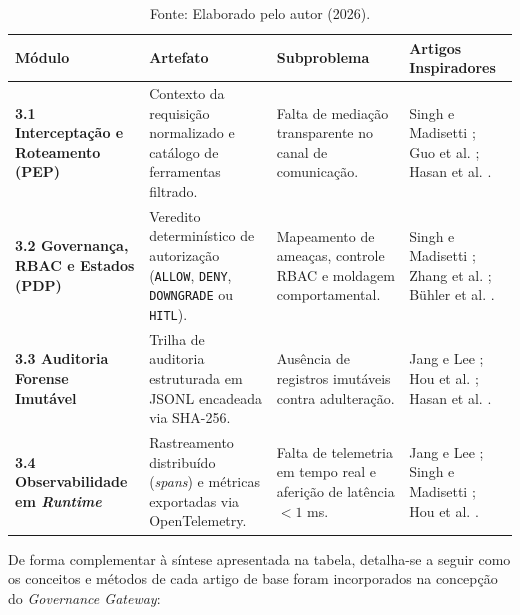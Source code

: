 \begin{table}[H]
\centering
\caption{Mapeamento entre os módulos do Modelo Conceitual, artefatos, subproblemas e artigos inspiradores.}
\label{tab:mapeamento_modelo_artigos}
\footnotesize
\setlength{\tabcolsep}{5pt}
\renewcommand{\arraystretch}{1.3}
\begin{tabular}{|p{3.2cm}|p{3.8cm}|p{3.9cm}|p{3.4cm}|}
\hline
\textbf{Módulo} & \textbf{Artefato} & \textbf{Subproblema} & \textbf{Artigos Inspiradores} \\
\hline
\textbf{3.1 Interceptação e Roteamento (PEP)} & Contexto da requisição normalizado e catálogo de ferramentas filtrado. & Falta de mediação transparente no canal de comunicação. & Singh e Madisetti \cite{singh2026mcpsecure}; Guo et al. \cite{guo2025measurement}; Hasan et al. \cite{hasan2026mcp}. \\
\hline
\textbf{3.2 Governança, RBAC e Estados (PDP)} & Veredito determinístico de autorização (\texttt{ALLOW}, \texttt{DENY}, \texttt{DOWNGRADE} ou \texttt{HITL}). & Mapeamento de ameaças, controle RBAC e moldagem comportamental. & Singh e Madisetti \cite{singh2026mcpsecure}; Zhang et al. \cite{zhang2025acfix}; Bühler et al. \cite{buhler2026agentbound}. \\
\hline
\textbf{3.3 Auditoria Forense Imutável} & Trilha de auditoria estruturada em JSONL encadeada via SHA-256. & Ausência de registros imutáveis contra adulteração. & Jang e Lee \cite{jang2026hierarchical}; Hou et al. \cite{hou2025mcp}; Hasan et al. \cite{hasan2026mcp}. \\
\hline
\textbf{3.4 Observabilidade em \textit{Runtime}} & Rastreamento distribuído (\textit{spans}) e métricas exportadas via OpenTelemetry. & Falta de telemetria em tempo real e aferição de latência $< 1$ ms. & Jang e Lee \cite{jang2026hierarchical}; Singh e Madisetti \cite{singh2026mcpsecure}; Hou et al. \cite{hou2025mcp}. \\
\hline
\end{tabular}
\caption*{Fonte: Elaborado pelo autor (2026).}
\end{table}

De forma complementar à síntese apresentada na tabela, detalha-se a seguir como os conceitos e métodos de cada artigo de base foram incorporados na concepção do \textit{Governance Gateway}:

